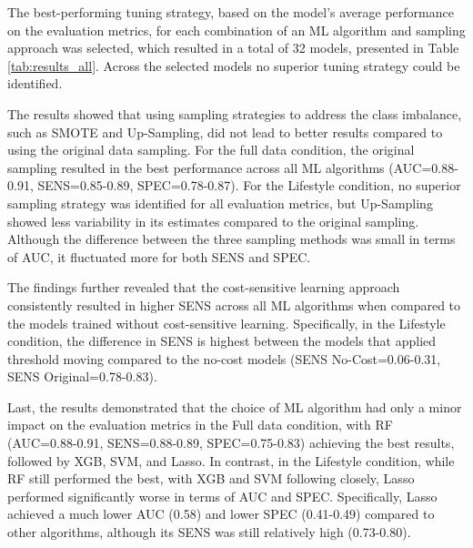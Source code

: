 The best-performing tuning strategy, based on the model's average performance on the evaluation metrics, for each combination of an ML algorithm and sampling approach was selected, which resulted in a total of 32 models, presented in Table \ref{tab:results_all}. Across the selected models no superior tuning strategy could be identified.

The results showed that using sampling strategies to address the class imbalance, such as SMOTE and Up-Sampling, did not lead to better results compared to using the original data sampling. For the full data condition, the original sampling resulted in the best performance across all ML algorithms (AUC=0.88-0.91, SENS=0.85-0.89, SPEC=0.78-0.87). For the Lifestyle condition, no superior sampling strategy was identified for all evaluation metrics, but Up-Sampling showed less variability in its estimates compared to the original sampling. Although the difference between the three sampling methods was small in terms of AUC, it fluctuated more for both SENS and SPEC.

The findings further revealed that the cost-sensitive learning approach consistently resulted in higher SENS across all ML algorithms when compared to the models trained without cost-sensitive learning. Specifically, in the Lifestyle condition,  the difference in SENS is highest between the models that applied threshold moving compared to the no-cost models (SENS No-Cost=0.06-0.31, SENS Original=0.78-0.83).

Last, the results demonstrated that the choice of ML algorithm had only a minor impact on the evaluation metrics in the Full data condition, with RF (AUC=0.88-0.91, SENS=0.88-0.89, SPEC=0.75-0.83) achieving the best results, followed by XGB, SVM, and Lasso. In contrast, in the Lifestyle condition, while RF still performed the best, with XGB and SVM following closely, Lasso performed significantly worse in terms of AUC and SPEC. Specifically, Lasso achieved a much lower AUC (0.58) and lower SPEC (0.41-0.49) compared to other algorithms, although its SENS was still relatively high (0.73-0.80).

